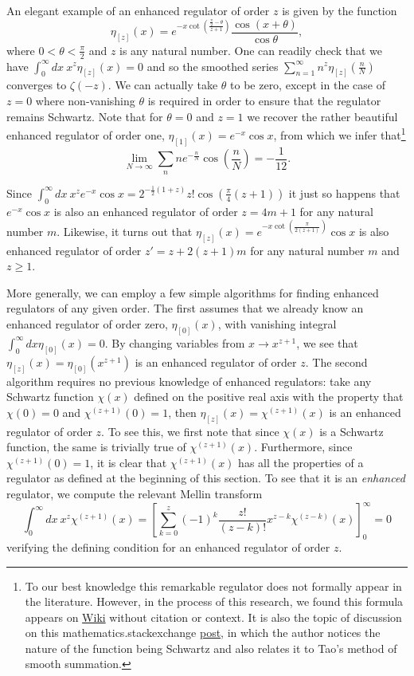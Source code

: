 \documentclass[12pt, letter]{article}
\def\be{\begin{equation}}
\def\ee{\end{equation}}
\begin{document}
An elegant example of an enhanced regulator of order $z$ is  given by the function 
\be \label{etaz}
\eta_{[z]}(x)=e^{-x\cot \left(\frac{\frac{\pi}{2}-\theta}{z+1}\right)}\frac{\cos(x+\theta)}{\cos\theta}, \ee
where $0< \theta<\frac{\pi}{2}$ and $z$ is any natural number. One can readily check that  we have $\int_0^\infty dx  \ x^z \eta_{[z]}(x)=0$ and so the smoothed series $\sum_{n=1}^\infty n^z \eta_{[z]}\left(\frac{n}{N}\right)$ converges to $\zeta(-z)$.   We can actually take $\theta$ to be zero, except in the case of $z=0$ where non-vanishing $\theta$ is required in order to ensure that the regulator remains Schwartz. Note that for  $\theta=0$ and $z=1$ we recover the rather beautiful enhanced regulator of order one, $\eta_{[1]}(x)=e^{-x} \cos x$, from which we infer that\footnote{To our best knowledge this remarkable regulator does not formally appear in the literature. However, in the process of this research, we found this formula appears on \href{https://en.wikiversity.org/wiki/MATLAB/Divergent_series_investigations}{Wiki} without citation or context. It is also the topic of discussion on this mathematics.stackexchange \href{https://math.stackexchange.com/questions/1327812/limit-approach-to-finding-1234-ldots}{post}, in which the author notices the nature of the function being Schwartz and also relates it to Tao's method of smooth summation.}
$$\lim_{N \to \infty} \sum_n n e^{-\frac{n}{N}} \cos \left(\frac{n}{N} \right)=-\frac{1}{12}.$$ 

 Since $\int_0^\infty dx \  x^z e^{-x} \cos x=2^{-\frac12(1+z)}z! \cos \left(\frac{\pi}{4} (z+1)\right)$ it just so happens that $e^{-x} \cos x$ is also an enhanced regulator of order $z=4m+1$ for any natural number $m$. Likewise, it turns out that $\eta_{[z]}(x)=e^{-x\cot \left(\frac{\pi}{2(z+1)}\right)}\cos x $  is also enhanced regulator of order $z'=z+2(z+1)m$ for any natural number $m$ and $z \geq 1$.


More generally, we can employ a few simple algorithms for finding enhanced regulators of any given order. The first assumes that we already know an enhanced regulator of order zero, $\eta_{[0]}(x)$, with vanishing integral $\int_0^\infty dx \eta_{[0]}(x)=0$. By changing variables from $x \to x^{z+1}$, we see that $\eta_{[z]}(x)=\eta_{[0]}(x^{z+1})$ is an enhanced regulator of order $z$.  
The second algorithm requires no previous knowledge of enhanced regulators: take any Schwartz function $\chi(x)$ defined on the positive real axis with the property that $\chi(0)=0$  and  $\chi^{(z+1)}(0)=1$, then $\eta_{[z]}(x)=\chi^{(z+1)}(x)$ is an enhanced regulator of order $z$. To see this, we first note that since $\chi(x)$  is a Schwartz function, the same is trivially true of $\chi^{(z+1)}(x)$. Furthermore, since $\chi^{(z+1)}(0)=1$, it is clear that $\chi^{(z+1)}(x)$ has all the properties of a regulator as defined at the beginning of this section. To see that it is an {\it enhanced} regulator, we compute the relevant Mellin transform
\be
\int_0^\infty  dx \ x^z\chi^{(z+1)}(x)=\left[ \sum_{k=0}^{z} (-1)^k \frac{z!}{(z-k)!} x^{z-k} \chi^{(z-k)}(x)\right]^\infty_0=0
\ee
verifying the defining condition for an enhanced regulator of order $z$. 
\end{document}
